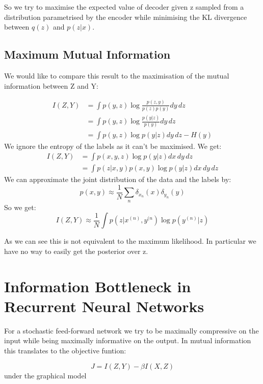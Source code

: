 \documentclass[a4paper]{article}
\begin{document}
So we try to maximise the expected value of decoder given z sampled from a distribution parametrised by the encoder while minimising the KL divergence between $q(z)$ and $p(z|x)$.

\subsection{Maximum Mutual Information}

We would like to compare this result to the maximisation of the  mutual information between Z and Y:

\begin{align}
I(Z, Y) &= \int p(y, z) \log \frac{p(z, y)}{p(z)p(y)} dy\,dz\\
& = \int p(y, z) \log \frac{p(y|z)}{p(y)} dy\,dz\\
&= \int p(y, z) \log p(y|z) dy\,dz - H(y) 
\end{align}
We ignore the entropy of the labels as it can't be maximised. We get:
\begin{align}
I(Z, Y) &= \int p(x, y, z) \log p(y| z) dx\,dy\,dz\\
&= \int p(z | x, y) p(x, y) \log p(y | z) dx\,dy\,dz
\end{align}
We can approximate the joint distribution of the data and the labels by:
$$ p(x, y) \approx \frac{1}{N}\sum_n \delta_{x_n}(x) \delta_{y_n}(y)$$
So we get:
$$ I(Z, Y) \approx \frac{1}{N} \int p(z | x^{(n)}, y^{(n}) \log p(y^{(n)} | z) $$

As we can see this is not equivalent to the maximum likelihood. In particular we have no way to easily get the posterior over z.

\section{Information Bottleneck in Recurrent Neural Networks}

For a stochastic feed-forward network we try to be maximally compressive on the input while being maximally informative on the output. In mutual information this translates to the objective funtion:

$$ J = I(Z, Y) - \beta I(X, Z)$$ under the graphical model

\begin{center}
\end{center}
\end{document}
